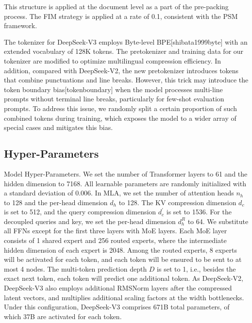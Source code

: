 \documentclass[11pt,a4paper]{article}
\begin{document}
This structure is applied at the document level as a part of the pre-packing process. The FIM strategy is applied at a rate of 0.1, consistent with the PSM framework.

The tokenizer for DeepSeek-V3 employs Byte-level BPE[shibata1999byte] with an extended vocabulary of 128K tokens. The pretokenizer and training data for our tokenizer are modified to optimize multilingual compression efficiency. In addition, compared with DeepSeek-V2, the new pretokenizer introduces tokens that combine punctuations and line breaks. However, this trick may introduce the token boundary bias[tokenboundary] when the model processes multi-line prompts without terminal line breaks, particularly for few-shot evaluation prompts. To address this issue, we randomly split a certain proportion of such combined tokens during training, which exposes the model to a wider array of special cases and mitigates this bias.

\subsection{Hyper-Parameters}

Model Hyper-Parameters. We set the number of Transformer layers to 61 and the hidden dimension to 7168. All learnable parameters are randomly initialized with a standard deviation of 0.006. In MLA, we set the number of attention heads $n_h$ to 128 and the per-head dimension $d_h$ to 128. The KV compression dimension $d_c$ is set to 512, and the query compression dimension $d_c^{\prime}$ is set to 1536. For the decoupled queries and key, we set the per-head dimension $d_h^R$ to 64. We substitute all FFNs except for the first three layers with MoE layers. Each MoE layer consists of 1 shared expert and 256 routed experts, where the intermediate hidden dimension of each expert is 2048. Among the routed experts, 8 experts will be activated for each token, and each token will be ensured to be sent to at most 4 nodes. The multi-token prediction depth $D$ is set to 1, i.e., besides the exact next token, each token will predict one additional token. As DeepSeek-V2, DeepSeek-V3 also employs additional RMSNorm layers after the compressed latent vectors, and multiplies additional scaling factors at the width bottlenecks. Under this configuration, DeepSeek-V3 comprises 671B total parameters, of which 37B are activated for each token.
\end{document}
